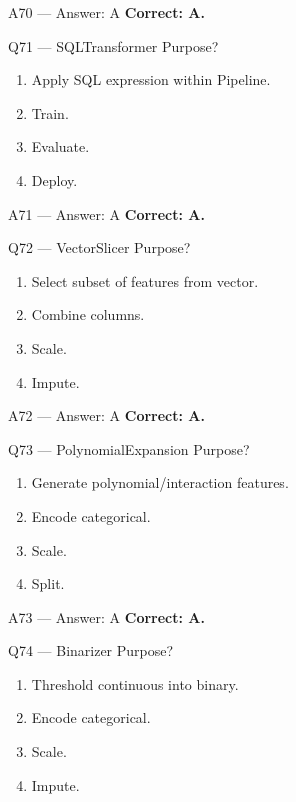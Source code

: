 \documentclass[aspectratio=169,9pt]{beamer}
\begin{document}
	\begin{frame}{A70 — Answer: A}
		\textbf{Correct: A.}
	\end{frame}
	
	\begin{frame}{Q71 — SQLTransformer}
		Purpose?
		\begin{enumerate}[label=\Alph*.]
			\item Apply SQL expression within Pipeline.
			\item Train.
			\item Evaluate.
			\item Deploy.
		\end{enumerate}
	\end{frame}
	
	\begin{frame}{A71 — Answer: A}
		\textbf{Correct: A.}
	\end{frame}
	
	\begin{frame}{Q72 — VectorSlicer}
		Purpose?
		\begin{enumerate}[label=\Alph*.]
			\item Select subset of features from vector.
			\item Combine columns.
			\item Scale.
			\item Impute.
		\end{enumerate}
	\end{frame}
	
	\begin{frame}{A72 — Answer: A}
		\textbf{Correct: A.}
	\end{frame}
	
	\begin{frame}{Q73 — PolynomialExpansion}
		Purpose?
		\begin{enumerate}[label=\Alph*.]
			\item Generate polynomial/interaction features.
			\item Encode categorical.
			\item Scale.
			\item Split.
		\end{enumerate}
	\end{frame}
	
	\begin{frame}{A73 — Answer: A}
		\textbf{Correct: A.}
	\end{frame}
	
	\begin{frame}{Q74 — Binarizer}
		Purpose?
		\begin{enumerate}[label=\Alph*.]
			\item Threshold continuous into binary.
			\item Encode categorical.
			\item Scale.
			\item Impute.
		\end{enumerate}
	\end{frame}
	
\end{document}
